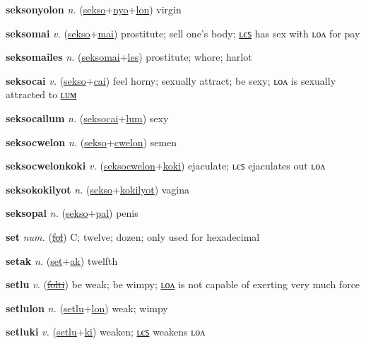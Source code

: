 \textbf{\hypertarget{seksonyolon}{seksonyolon}} \textit{n.} (\hyperlink{sekso}{sekso}+\allowbreak \hyperlink{nyo}{nyo}+\allowbreak \hyperlink{lon}{lon})
virgin

\textbf{\hypertarget{seksomai}{seksomai}} \textit{v.} (\hyperlink{sekso}{sekso}+\allowbreak \hyperlink{mai}{mai})
prostitute; sell one’s body; \hyperlink{seksomailes}{ʟєꜱ} has sex with ʟᴏᴧ for pay

\textbf{\hypertarget{seksomailes}{seksomailes}} \textit{n.} (\hyperlink{seksomai}{seksomai}+\allowbreak \hyperlink{les}{les})
prostitute; whore; harlot

\textbf{\hypertarget{seksocai}{seksocai}} \textit{v.} (\hyperlink{sekso}{sekso}+\allowbreak \hyperlink{cai}{cai})
feel horny; sexually attract; be sexy; ʟᴏᴧ is sexually attracted to \hyperlink{seksocailum}{ʟᴜᴍ}

\textbf{\hypertarget{seksocailum}{seksocailum}} \textit{n.} (\hyperlink{seksocai}{seksocai}+\allowbreak \hyperlink{lum}{lum})
sexy

\textbf{\hypertarget{seksocwelon}{seksocwelon}} \textit{n.} (\hyperlink{sekso}{sekso}+\allowbreak \hyperlink{cwelon}{cwelon})
semen

\textbf{\hypertarget{seksocwelonkoki}{seksocwelonkoki}} \textit{v.} (\hyperlink{seksocwelon}{seksocwelon}+\allowbreak \hyperlink{koki}{koki})
ejaculate; ʟєꜱ ejaculates out ʟᴏᴧ

\textbf{\hypertarget{seksokokilyot}{seksokokilyot}} \textit{n.} (\hyperlink{sekso}{sekso}+\allowbreak \hyperlink{kokilyot}{kokilyot})
vagina

\textbf{\hypertarget{seksopal}{seksopal}} \textit{n.} (\hyperlink{sekso}{sekso}+\allowbreak \hyperlink{pal}{pal})
penis

\textbf{\hypertarget{set}{set}} \textit{num.} (\hyperlink{fol}{\sout{fol}})
C; twelve; dozen; only used for hexadecimal

\textbf{\hypertarget{setak}{setak}} \textit{n.} (\hyperlink{set}{set}+\allowbreak \hyperlink{ak}{ak})
twelfth

\textbf{\hypertarget{setlu}{setlu}} \textit{v.} (\hyperlink{folti}{\sout{folti}})
be weak; be wimpy; \hyperlink{setlulon}{ʟᴏᴧ} is not capable of exerting very much force

\textbf{\hypertarget{setlulon}{setlulon}} \textit{n.} (\hyperlink{setlu}{setlu}+\allowbreak \hyperlink{lon}{lon})
weak; wimpy

\textbf{\hypertarget{setluki}{setluki}} \textit{v.} (\hyperlink{setlu}{setlu}+\allowbreak \hyperlink{ki}{ki})
weaken; \hyperlink{setlukiles}{ʟєꜱ} weakens ʟᴏᴧ

